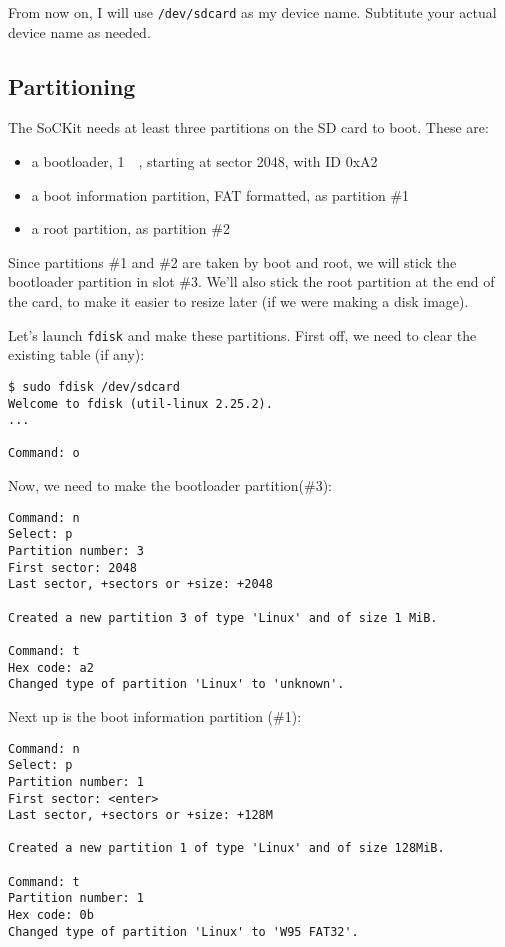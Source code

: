 \documentclass{sockitguide}
\begin{document}
From now on, I will use \texttt{/dev/sdcard} as my device
name. Subtitute your actual device name as needed.

\subsection{Partitioning}

The SoCKit needs at least three partitions on the SD card to boot. These
are:
\begin{itemize}
\item a bootloader, \SI{1}{\mebi\byte}, starting at sector 2048, with ID 0xA2
\item a boot information partition, FAT formatted, as partition \#1
\item a root partition, as partition \#2
\end{itemize}

Since partitions \#1 and \#2 are taken by boot and root, we will stick
the bootloader partition in slot \#3. We'll also stick the root
partition at the end of the card, to make it easier to resize later
(if we were making a disk image).

Let's launch \texttt{fdisk} and make these partitions. First off, we
need to clear the existing table (if any):
\begin{verbatim}
$ sudo fdisk /dev/sdcard
Welcome to fdisk (util-linux 2.25.2).
...

Command: o
\end{verbatim}

Now, we need to make the bootloader partition(\#3):
\begin{verbatim}
Command: n
Select: p
Partition number: 3
First sector: 2048
Last sector, +sectors or +size: +2048

Created a new partition 3 of type 'Linux' and of size 1 MiB.

Command: t
Hex code: a2
Changed type of partition 'Linux' to 'unknown'.
\end{verbatim}

Next up is the boot information partition (\#1):
\begin{verbatim}
Command: n
Select: p
Partition number: 1
First sector: <enter>
Last sector, +sectors or +size: +128M

Created a new partition 1 of type 'Linux' and of size 128MiB.

Command: t
Partition number: 1
Hex code: 0b
Changed type of partition 'Linux' to 'W95 FAT32'.
\end{verbatim}
\end{document}
